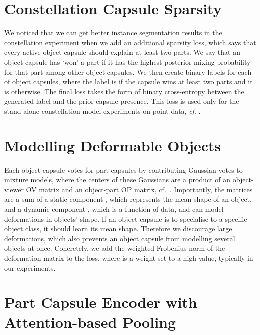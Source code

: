 \documentclass{article}
\begin{document}
 \section{Constellation Capsule Sparsity}
\label{app:constellation_caps_sparsity}

We noticed that we can get better instance segmentation results in the constellation experiment when we add an additional sparsity loss, which says that every active object capsule should explain at least two parts.
We say that an object capsule has `won' a part if it has the highest posterior mixing probability for that part among other object capsules.
We then create binary labels for each of object capsules, where the label is  if the capsule wins at least two parts and it is  otherwise.
The final loss takes the form of binary cross-entropy between the generated label and the prior capsule presence. This loss is used only for the stand-alone constellation model experiments on point data, \textit{cf}. . \section{Modelling Deformable Objects}
\label{app:deformations}

Each object capsule votes for part capsules by contributing Gaussian votes to mixture models, where the centers of these Gaussians are a product of an object-viewer \gls{OV} matrix and an object-part \gls{OP} matrix, cf.\ .
Importantly, the   matrices  are a sum of a static component , which represents the mean shape of an object, and a dynamic component , which is a function of data, and can model deformations in objects' shape.
If an object capsule is to specialise to a specific object class, it should learn its mean shape.
Therefore we discourage large deformations, which also prevents an object capsule from modelling several objects at once.
Concretely, we add the weighted Frobenius norm of the deformation matrix  to the loss, where  is a weight set to a high value, typically  in our experiments. \section{Part Capsule Encoder with Attention-based Pooling}
\label{app:attention_based_pooling}
\end{document}

